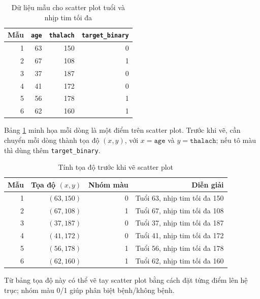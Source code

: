 \begin{table}[H]
\centering
\caption{Dữ liệu mẫu cho scatter plot tuổi và nhịp tim tối đa}
\label{tab:chapter1_scatter_sample_data}
\small
\begin{tabular}{rrrr}
\toprule
Mẫu & \texttt{age} & \texttt{thalach} & \texttt{target\_binary} \\
\midrule
1 & 63 & 150 & 0 \\
2 & 67 & 108 & 1 \\
3 & 37 & 187 & 0 \\
4 & 41 & 172 & 0 \\
5 & 56 & 178 & 1 \\
6 & 62 & 160 & 1 \\
\bottomrule
\end{tabular}
\end{table}

Bảng \ref{tab:chapter1_scatter_sample_data} minh họa mỗi dòng là một điểm trên scatter plot. Trước khi vẽ, cần chuyển mỗi dòng thành tọa độ $(x,y)$, với $x=\texttt{age}$ và $y=\texttt{thalach}$; nếu tô màu thì dùng thêm \texttt{target\_binary}.

\begin{table}[H]
\centering
\caption{Tính tọa độ trước khi vẽ scatter plot}
\label{tab:chapter1_scatter_calc}
\small
\begin{tabular}{rrrr}
\toprule
Mẫu & Tọa độ $(x,y)$ & Nhóm màu & Diễn giải \\
\midrule
1 & $(63,150)$ & 0 & Tuổi 63, nhịp tim tối đa 150 \\
2 & $(67,108)$ & 1 & Tuổi 67, nhịp tim tối đa 108 \\
3 & $(37,187)$ & 0 & Tuổi 37, nhịp tim tối đa 187 \\
4 & $(41,172)$ & 0 & Tuổi 41, nhịp tim tối đa 172 \\
5 & $(56,178)$ & 1 & Tuổi 56, nhịp tim tối đa 178 \\
6 & $(62,160)$ & 1 & Tuổi 62, nhịp tim tối đa 160 \\
\bottomrule
\end{tabular}
\end{table}

Từ bảng tọa độ này có thể vẽ tay scatter plot bằng cách đặt từng điểm lên hệ trục; nhóm màu 0/1 giúp phân biệt bệnh/không bệnh.

